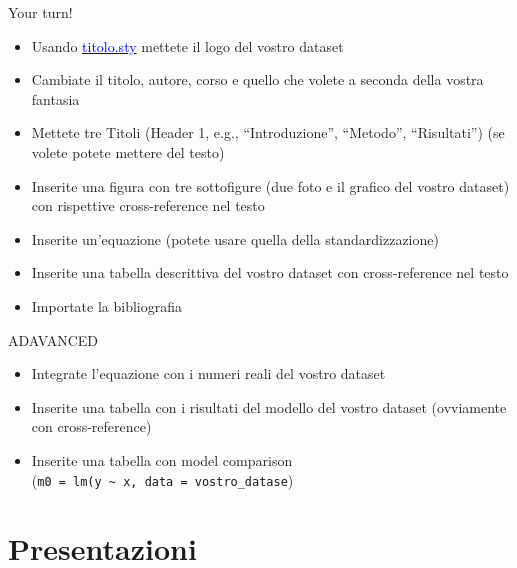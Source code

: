 \documentclass[
  ignorenonframetext,
]{beamer}
\begin{document}
\begin{frame}[fragile]{Your turn!}
\protect\hypertarget{your-turn}{}
\small

\begin{itemize}
\item
  Usando
  \href{https://drive.google.com/file/d/1O4YgvAZnPJbNMOz0tugz5xf75TTxVvlY/view?usp=sharing}{\textcolor{blue}{titolo.sty}}
  mettete il logo del vostro dataset
\item
  Cambiate il titolo, autore, corso e quello che volete a seconda della
  vostra fantasia
\item
  Mettete tre Titoli (Header 1, e.g., ``Introduzione'', ``Metodo'',
  ``Risultati'') (se volete potete mettere del testo)
\item
  Inserite una figura con tre sottofigure (due foto e il grafico del
  vostro dataset) con rispettive cross-reference nel testo
\item
  Inserite un'equazione (potete usare quella della standardizzazione)
\item
  Inserite una tabella descrittiva del vostro dataset con
  cross-reference nel testo
\item
  Importate la bibliografia
\end{itemize}

\begin{center}
ADAVANCED
\end{center}

\begin{itemize}
\item
  Integrate l'equazione con i numeri reali del vostro dataset
\item
  Inserite una tabella con i risultati del modello del vostro dataset
  (ovviamente con cross-reference)
\item
  Inserite una tabella con model comparison
  (\texttt{m0\ =\ lm(y\ \textasciitilde{}\ x,\ data\ =\ vostro\_datase})
\end{itemize}
\end{frame}

\hypertarget{presentazioni}{%
\section{Presentazioni}\label{presentazioni}}
\end{document}
